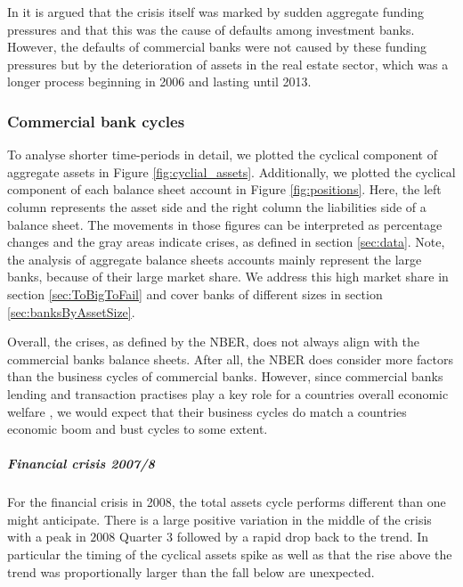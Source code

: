 \documentclass[12pt, a4paper]{article} %
\begin{document}
In \cite{antoniades2019commercial} it is argued that the crisis itself was marked by sudden aggregate funding pressures and that this was the cause of defaults among investment banks. However, the defaults of commercial banks were not caused by these funding pressures but by the deterioration of assets in the real estate sector, which was a longer process beginning in 2006 and lasting until 2013.
\fi




\subsubsection{Commercial bank cycles}

To analyse shorter time-periods in detail, we plotted the cyclical component of aggregate assets in Figure \ref{fig:cyclial_assets}. Additionally, we plotted the cyclical component of each balance sheet account in Figure \ref{fig:positions}. Here, the left column represents the asset side and the right column the liabilities side of a balance sheet. The movements in those figures can be interpreted as percentage changes and the gray areas indicate crises, as defined in section \ref{sec:data}. Note, the analysis of aggregate balance sheets accounts mainly represent the large banks, because of their large market share. We address this high market share in section \ref{sec:ToBigToFail} and cover banks of different sizes in section \ref{sec:banksByAssetSize}.

Overall, the crises, as defined by the NBER, does not always align with the commercial banks balance sheets. After all, the NBER does consider more factors than the business cycles of commercial banks. However, since commercial banks lending and transaction practises play a key role for a countries overall economic welfare , we would expect that their business cycles do match a countries economic boom and bust cycles to some extent.


\subparagraph{Financial crisis 2007/8}
For the financial crisis in 2008, the total assets cycle performs different than one might anticipate. There is a large positive variation in the middle of the crisis with a peak in $2008$ Quarter 3 followed by a rapid drop back to the trend. In particular the timing of the cyclical assets spike as well as that the rise above the trend was proportionally larger than the fall below are unexpected. 
\end{document}
